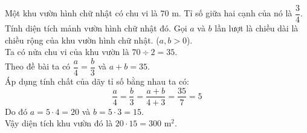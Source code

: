 		\begin{ex}%
			Một khu vườn hình chữ nhật có chu vi là $70$ m. Tỉ số giữa hai cạnh của nó là $\dfrac{3}{4}$. Tính diện tích mảnh vườn hình chữ nhật đó. 
			\loigiai
			{
					Gọi $a$ và $b$ lần lượt là chiều dài là chiều rộng của khu vườn hình chữ nhật. ($a,b>0$).\\
					Ta có nửa chu vi của khu vườn là $70\div 2=35$.\\
					Theo đề bài ta có $\dfrac{a}{4}=\dfrac{b}{3}$ và $a+b=35$.\\
					Áp dụng tính chất của dãy tỉ số bằng nhau ta có:
					$$\dfrac{a}{4}=\dfrac{b}{3}=\dfrac{a+b}{4+3}=\dfrac{35}{7}=5$$
					Do đó  $a=5\cdot 4=20$ và $b=5\cdot 3=15$.\\
					Vậy diện tích khu vườn đó là $20\cdot 15=300$ m$^2$.
			}
		\end{ex}
	

